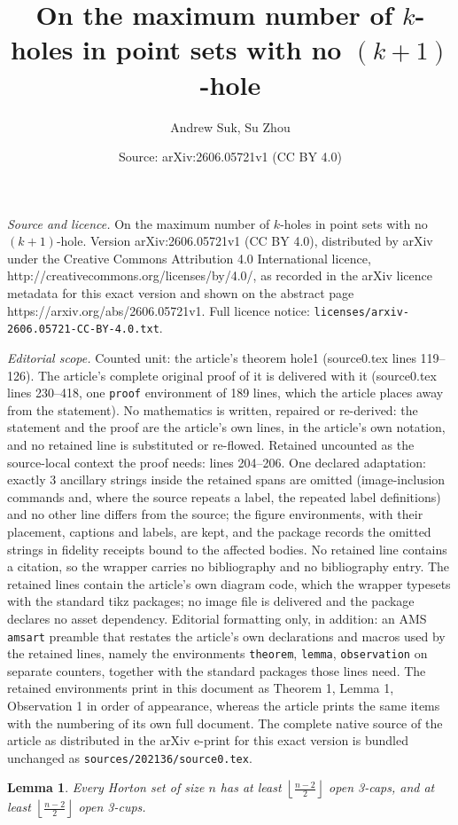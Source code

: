\documentclass[10pt,a4paper]{amsart}
\title{On the maximum number of $k$-holes in point sets with no $(k + 1)$-hole}
\author{Andrew Suk, Su Zhou}
\date{Source: arXiv:2606.05721v1 (CC BY 4.0)}
\newtheorem{lemma}{Lemma}
\begin{document}
\maketitle

\noindent\emph{Source and licence.} On the maximum number of $k$-holes in point sets with no $(k + 1)$-hole. Version arXiv:2606.05721v1 (CC BY 4.0), distributed by arXiv under the Creative Commons Attribution 4.0 International licence, http://creativecommons.org/licenses/by/4.0/, as recorded in the arXiv licence metadata for this exact version and shown on the abstract page https://arxiv.org/abs/2606.05721v1. Full licence notice: \texttt{licenses/arxiv-2606.05721-CC-BY-4.0.txt}.\par\smallskip

\noindent\textit{Editorial scope.} Counted unit: the article's theorem hole1 (source0.tex lines 119--126). The article's complete original proof of it is delivered with it (source0.tex lines 230--418, one \texttt{proof} environment of 189 lines, which the article places away from the statement). No mathematics is written, repaired or re-derived: the statement and the proof are the article's own lines, in the article's own notation, and no retained line is substituted or re-flowed.  Retained uncounted as the source-local context the proof needs: lines 204--206.  One declared adaptation: exactly 3 ancillary strings inside the retained spans are omitted (image-inclusion commands and, where the source repeats a label, the repeated label definitions) and no other line differs from the source; the figure environments, with their placement, captions and labels, are kept, and the package records the omitted strings in fidelity receipts bound to the affected bodies.  No retained line contains a citation, so the wrapper carries no bibliography and no bibliography entry.  The retained lines contain the article's own diagram code, which the wrapper typesets with the standard tikz packages; no image file is delivered and the package declares no asset dependency.  Editorial formatting only, in addition: an AMS \texttt{amsart} preamble that restates the article's own declarations and macros used by the retained lines, namely the environments \texttt{theorem}, \texttt{lemma}, \texttt{observation} on separate counters, together with the standard packages those lines need.  The retained environments print in this document as Theorem 1, Lemma 1, Observation 1 in order of appearance, whereas the article prints the same items with the numbering of its own full document.  The complete native source of the article as distributed in the arXiv e-print for this exact version is bundled unchanged as \texttt{sources/202136/source0.tex}.
\begin{lemma}\label{lem:3cap}
Every Horton set of size $n$ has at least $\left\lfloor \frac{n-2}{2}\right\rfloor$ open 3-caps, and at least $\left\lfloor \frac{n-2}{2}\right\rfloor$ open 3-cups.
\end{lemma}
\end{document}
